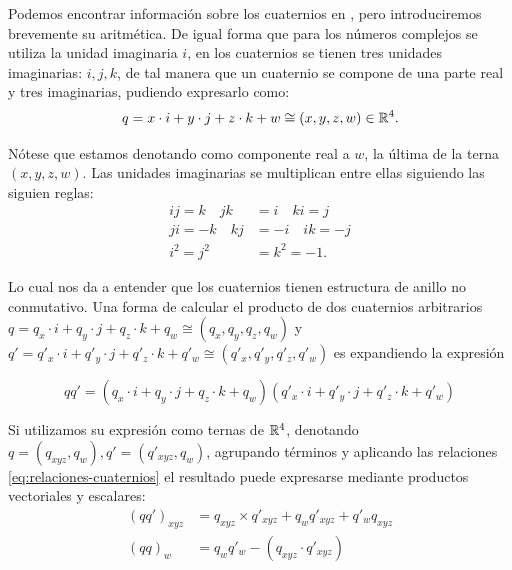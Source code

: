 Podemos encontrar información sobre los cuaternios en \cite{quaternions}, pero introduciremos brevemente su aritmética. De igual forma que para los números complejos se utiliza la unidad imaginaria $i$, en los cuaternios se tienen tres unidades imaginarias: $i,j,k$, de tal manera que un cuaternio se compone de una parte real y tres imaginarias, pudiendo expresarlo como:
\begin{equation}
    q = x\cdot i + y\cdot j + z \cdot k + w \cong (x,y,z,w)\in \mathbb{R}^4.
\end{equation}

Nótese que estamos denotando como componente real a $w$, la última de la terna $(x,y,z,w)$. Las unidades imaginarias se multiplican entre ellas siguiendo las siguien reglas:
\begin{equation}
    \label{eq:relaciones-cuaternios}
    \begin{split}
        ij = k \quad jk &= i \quad ki = j \\
        ji = -k \quad kj &= -i \quad ik = -j \\
        i^2 = j^2 &= k^2 = -1. 
    \end{split}
\end{equation}

Lo cual nos da a entender que los cuaternios tienen estructura de anillo no conmutativo. Una forma de calcular el producto de dos cuaternios arbitrarios $q = q_x\cdot i + q_y\cdot j + q_z \cdot k + q_w\cong (q_x,q_y,q_z,q_w)$ y $q' = q'_x\cdot i + q'_y\cdot j + q'_z \cdot k + q'_w\cong (q'_x,q'_y,q'_z,q'_w)$ es expandiendo la expresión

\begin{equation}
    qq' = (q_x\cdot i + q_y\cdot j + q_z \cdot k + q_w)(q'_x\cdot i + q'_y\cdot j + q'_z \cdot k + q'_w) 
\end{equation}

Si utilizamos su expresión como ternas de $\mathbb{R}^4$, denotando $q=(q_{xyz},q_w), q'=(q'_{xyz},q_w)$, agrupando términos y aplicando las relaciones \ref{eq:relaciones-cuaternios} el resultado puede expresarse mediante productos vectoriales y escalares:
\begin{equation}
    \label{eq:producto-cuaternios}
    \begin{split}
        (qq')_{xyz} &= q_{xyz}\times q'_{xyz} + q_w q'_{xyz} + q'_wq_{xyz} \\
        (qq)_w &= q_wq'_w - (q_{xyz}\cdot q'_{xyz})
    \end{split}
\end{equation}

